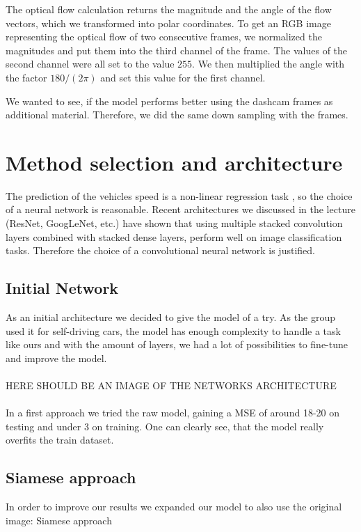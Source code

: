 \documentclass[conference]{IEEEtran}
\begin{document}
The optical flow calculation returns the magnitude and
the angle of the flow vectors, which we transformed into polar coordinates. To get an RGB image representing the
optical flow of two consecutive frames, we normalized the magnitudes and put them into the third channel of the frame. The values
of the second channel were all set to the value $255$. We then multiplied the angle with the factor $180/(2\pi)$ and set this value 
for the first channel.

We wanted to see, if the model performs better using the dashcam frames as additional material. Therefore, we did the same down 
sampling with the frames.

\section{Method selection and architecture}
The prediction of the vehicles speed is a non-linear regression task , so the choice of a neural network is reasonable. 
Recent architectures we discussed in the lecture (ResNet, GoogLeNet, etc.) have shown that using multiple stacked convolution layers
combined with stacked dense layers, perform well on image classification tasks. Therefore the choice of a convolutional neural 
network is justified.

\subsection{Initial Network}

As an initial architecture we decided to give the model of \cite{NVIDIA2016} a try. As the group used it
for self-driving cars, the model has enough complexity to handle a task like ours and with the amount of layers, we had a lot of
possibilities to fine-tune and improve the model.\\
\\HERE SHOULD BE AN IMAGE OF THE NETWORKS ARCHITECTURE\\
\\In a first approach we tried the raw model, gaining a MSE of around 18-20 on testing and under 3 on training. One can clearly 
see, that the model really overfits the train dataset.

\subsection{Siamese approach}

In order to improve our results we expanded our model to also use the original image: Siamese approach
\end{document}
